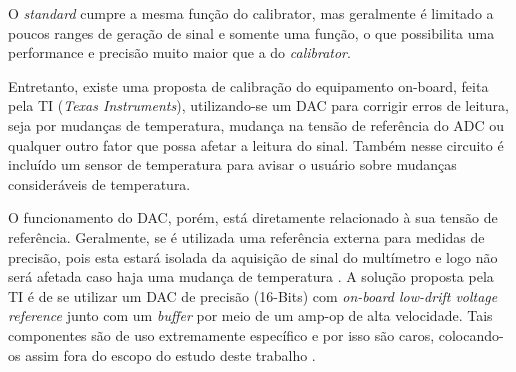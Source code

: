 O \textit{standard} cumpre a mesma função do calibrator, mas geralmente é limitado a poucos ranges de geração de sinal e somente uma função, o que possibilita uma performance e precisão muito maior que a do \textit{calibrator}.

Entretanto, existe uma proposta de calibração do equipamento on-board, feita pela \gls{TI} (\textit{Texas Instruments}), utilizando-se um \gls{DAC} para corrigir erros de leitura, seja por mudanças de temperatura, mudança na tensão de referência do \gls{ADC} ou qualquer outro fator que possa afetar a leitura do sinal. Também nesse circuito é incluído um sensor de temperatura para avisar o usuário sobre mudanças consideráveis de temperatura.

O funcionamento do \gls{DAC}, porém, está diretamente relacionado à sua tensão de referência. Geralmente, se é utilizada uma referência externa para medidas de precisão, pois esta estará isolada da aquisição de sinal do multímetro e logo não será afetada caso haja uma mudança de temperatura \cite{analogdac}. A solução proposta pela \gls{TI} é de se utilizar um \gls{DAC} de precisão (16-Bits) com \textit{on-board low-drift voltage reference} junto com um \textit{buffer} por meio de um \gls{amp-op} de alta velocidade. Tais componentes são de uso extremamente específico e por isso são caros, colocando-os assim fora do escopo do estudo deste trabalho \cite{DACTI}. %

